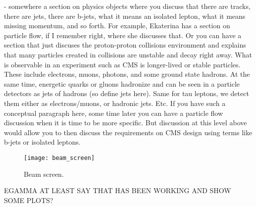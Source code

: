 \begin{small}
  - somewhere a section on physics objects where you discuss that there are tracks, there are jets, there are b-jets, what it means an isolated lepton, what it means missing momentum, and so forth. For example, Ekaterina has a section on particle flow, if I remember right, where she discusses that. Or you can have a section that just discuses the proton-proton collisions environment and explains that many particles created in collisions are unstable and decay right away. What is observable in an experiment such as CMS is longer-lived or stable particles. These include electrons, muons, photons, and some ground state hadrons. At the same time, energetic quarks or gluons hadronize and can be seen in a particle detectors as jets of hadrons (so define jets here). Same for tau leptons, we detect them either as electrons/muons, or hadronic jets. Etc. If you have such a conceptual paragraph here, some time later you can have a particle flow discussion when it is time to be more specific. But discussion at this level above would allow you to then discuss the requirements on CMS design using terms like b-jets or isolated leptons.




\begin{figure}[H]
  \centering
  \texttt{[image: beam\_screen]}
  \caption{Beam screen.}\label{beam_screen}
\end{figure}






  EGAMMA AT LEAST SAY THAT HAS BEEN WORKING AND SHOW SOME PLOTS?



\end{small}             %
 

